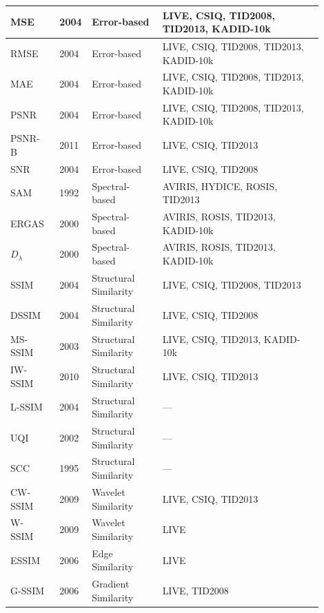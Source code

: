 \begin{longtable}{
p{0.13\linewidth}  %
p{0.05\linewidth}  %
p{0.22\linewidth}  %
p{0.50\linewidth}  %
}
    MSE~\cite{wang2004image} & 2004 & Error-based & LIVE, CSIQ, TID2008, TID2013, KADID-10k \\ \hline
    RMSE~\cite{wang2004image} & 2004 & Error-based & LIVE, CSIQ, TID2008, TID2013, KADID-10k \\ \hline
    MAE~\cite{wang2004image} & 2004 & Error-based & LIVE, CSIQ, TID2008, TID2013, KADID-10k \\ \hline
    PSNR~\cite{wang2004image} & 2004 & Error-based & LIVE, CSIQ, TID2008, TID2013, KADID-10k \\ \hline
    PSNR-B~\cite{ma2011psnrb} & 2011 & Error-based & LIVE, CSIQ, TID2013 \\ \hline
    SNR~\cite{wang2004image} & 2004 & Error-based & LIVE, CSIQ, TID2008 \\ \hline
    SAM~\cite{yuhas1992sam} & 1992 & Spectral-based & AVIRIS, HYDICE, ROSIS, TID2013 \\ \hline
    ERGAS~\cite{wald2000ergas} & 2000 & Spectral-based & AVIRIS, ROSIS, TID2013, KADID-10k \\ \hline
    $D_\lambda$~\cite{wald2000ergas} & 2000 & Spectral-based & AVIRIS, ROSIS, TID2013, KADID-10k \\ \hline
    SSIM~\cite{wang2004image} & 2004 & Structural Similarity & LIVE, CSIQ, TID2008, TID2013 \\ \hline
    DSSIM~\cite{wang2004image} & 2004 & Structural Similarity & LIVE, CSIQ, TID2008 \\ \hline
    MS-SSIM~\cite{wang2003multiscale} & 2003 & Structural Similarity & LIVE, CSIQ, TID2013, KADID-10k \\ \hline
    IW-SSIM~\cite{li2011iwssim} & 2010 & Structural Similarity & LIVE, CSIQ, TID2013 \\ \hline
    L-SSIM~\cite{wang2004image} & 2004 & Structural Similarity & --- \\ \hline
    UQI~\cite{wang2002uqi} & 2002 & Structural Similarity & --- \\ \hline
    SCC~\cite{eskicioglu1995scc} & 1995 & Structural Similarity & --- \\ \hline
    CW-SSIM~\cite{sampat2009cwssim} & 2009 & Wavelet Similarity & LIVE, CSIQ, TID2013 \\ \hline
    W-SSIM~\cite{li2009wssim} & 2009 & Wavelet Similarity & LIVE \\ \hline
    ESSIM~\cite{chen2006esim} & 2006 & Edge Similarity & LIVE \\ \hline
    G-SSIM~\cite{chen2006gssim} & 2006 & Gradient Similarity & LIVE, TID2008 \\ \hline

\end{longtable}
